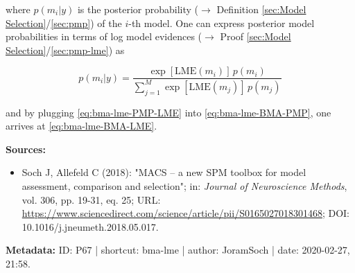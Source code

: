 \documentclass[a4paper,12pt,twoside]{book}
\begin{document}
where $p(m_i \vert y)$ is the posterior probability ($\rightarrow$ Definition \ref{sec:Model Selection}/\ref{sec:pmp}) of the $i$-th model. One can express posterior model probabilities in terms of log model evidences ($\rightarrow$ Proof \ref{sec:Model Selection}/\ref{sec:pmp-lme}) as

\begin{equation} \label{eq:bma-lme-PMP-LME}
p(m_i|y) = \frac{\exp[\mathrm{LME}(m_i)] \, p(m_i)}{\sum_{j=1}^{M} \exp[\mathrm{LME}(m_j)] \, p(m_j)}
\end{equation}

and by plugging \eqref{eq:bma-lme-PMP-LME} into \eqref{eq:bma-lme-BMA-PMP}, one arrives at \eqref{eq:bma-lme-BMA-LME}.


\vspace{1em}
\textbf{Sources:}
\begin{itemize}
\item Soch J, Allefeld C (2018): "MACS – a new SPM toolbox for model assessment, comparison and selection"; in: \textit{Journal of Neuroscience Methods}, vol. 306, pp. 19-31, eq. 25; URL: \url{https://www.sciencedirect.com/science/article/pii/S0165027018301468}; DOI: 10.1016/j.jneumeth.2018.05.017.
\end{itemize}


\vspace{1em}
\textbf{Metadata:} ID: P67 | shortcut: bma-lme | author: JoramSoch | date: 2020-02-27, 21:58.
\vspace{1em}
\end{document}
